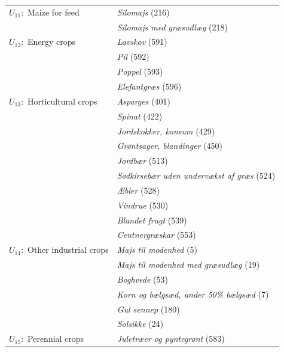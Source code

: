\documentclass[12pt]{article}
\begin{document}
\begin{longtable}{l | p{9cm}}
$U_{11}:$ Maize for feed
       & \textit{Silomajs} (216) \\
       & \textit{Silomajs med græsudlæg} (218) \\ \midrule
 
$U_{12}:$ Energy crops
       & \textit{Lavskov} (591) \\
       & \textit{Pil} (592) \\
       & \textit{Poppel} (593) \\
       & \textit{Elefantgræs} (596) \\ \midrule
 
$U_{13}:$ Horticultural crops
       & \textit{Asparges} (401) \\
       & \textit{Spinat} (422) \\
       & \textit{Jordskokker, konsum} (429) \\
       & \textit{Grøntsager, blandinger} (450) \\
       & \textit{Jordbær} (513) \\
       & \textit{Sødkirsebær uden undervækst af græs} (524) \\
       & \textit{Æbler} (528) \\
       & \textit{Vindrue} (530) \\
       & \textit{Blandet frugt} (539) \\
       & \textit{Centnergræskar} (553) \\ \midrule
 
$U_{14}:$ Other industrial crops
       & \textit{Majs til modenhed} (5) \\
       & \textit{Majs til modenhed med græsudlæg} (19) \\
       & \textit{Boghvede} (53) \\
       & \textit{Korn og bælgsæd, under 50\% bælgsæd} (7) \\
       & \textit{Gul sennep} (180) \\
       & \textit{Solsikke} (24) \\ \midrule
 
$U_{15}:$ Perennial crops
       & \textit{Juletræer og pyntegrønt} (583) \\
 
\end{longtable}
\endgroup


\newpage
\end{document}
